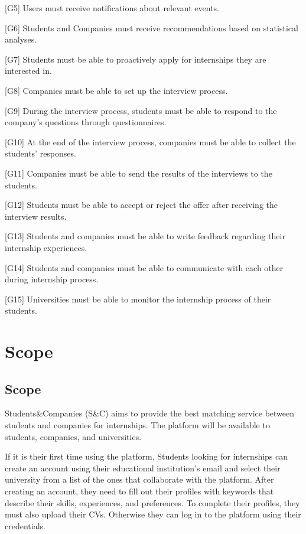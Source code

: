 [G5] Users must receive notifications about relevant events.

[G6] Students and Companies must receive recommendations based on statistical analyses.

[G7] Students must be able to proactively apply for internships they are interested in.

[G8] Companies must be able to set up the interview process.

[G9] During the interview process, students must be able to respond to the company's questions through questionnaires.

[G10] At the end of the interview process, companies must be able to collect the students' responses.

[G11] Companies must be able to send the results of the interviews to the students.

[G12] Students must be able to accept or reject the offer after receiving the interview results.

[G13] Students and companies must be able to write feedback regarding their internship experiences.

[G14] Students and companies must be able to communicate with each other during internship process.

[G15] Universities must be able to monitor the internship process of their students.


\newpage
\section{Scope}\label{sec:scope}
\subsection{Scope}\label{subsec:scope}
Students\&Companies (S\&C) aims to provide the best matching service between students and companies for internships. The platform will be available
to students, companies, and universities.

If it is their first time using the platform, Students looking for internships can create an account using their educational institution's email and 
select their university from a list of the ones that collaborate with the platform. 
After creating an account, they need to fill out their profiles with keywords that describe their skills, experiences, and preferences. To complete
their profiles, they must also upload their CVs.
Otherwise they can log in to the platform using their credentials.

